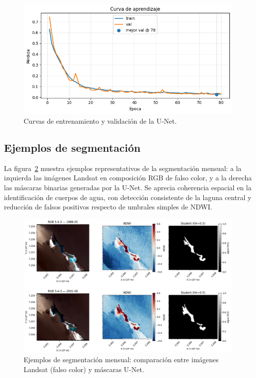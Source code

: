 \begin{figure}[H]
    \centering
    \includegraphics[scale=0.55]{Figures/curva_entrenamiento.png}
    \caption{Curvas de entrenamiento y validación de la U-Net.}
    \label{fig:unet_training}
\end{figure}

\subsection{Ejemplos de segmentación}
La figura~\ref{fig:unet_examples} muestra ejemplos representativos de la segmentación mensual: a la izquierda las imágenes Landsat en composición RGB de falso color, y a la derecha las máscaras binarias generadas por la U-Net. Se aprecia coherencia espacial en la identificación de cuerpos de agua, con detección consistente de la laguna central y reducción de falsos positivos respecto de umbrales simples de NDWI.

\begin{figure}[H]
    \centering
    \includegraphics[scale=0.31]{Figures/unet_examples.png}
    \caption{Ejemplos de segmentación mensual: comparación entre imágenes Landsat (falso color) y máscaras U-Net.}
    \label{fig:unet_examples}
\end{figure}

